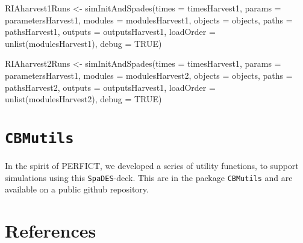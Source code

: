 \documentclass[
]{article}
\newenvironment{Shaded}{\begin{snugshade}}{\end{snugshade}}
\newcommand{\AttributeTok}[1]{\textcolor[rgb]{0.77,0.63,0.00}{#1}}
\newcommand{\ConstantTok}[1]{\textcolor[rgb]{0.00,0.00,0.00}{#1}}
\newcommand{\FunctionTok}[1]{\textcolor[rgb]{0.00,0.00,0.00}{#1}}
\newcommand{\NormalTok}[1]{#1}
\newcommand{\OtherTok}[1]{\textcolor[rgb]{0.56,0.35,0.01}{#1}}
\begin{document}
\begin{Shaded}
\begin{Highlighting}[]
\NormalTok{RIAharvest1Runs }\OtherTok{\textless{}{-}} \FunctionTok{simInitAndSpades}\NormalTok{(}\AttributeTok{times =}\NormalTok{ timesHarvest1,}
                               \AttributeTok{params =}\NormalTok{ parametersHarvest1,}
                               \AttributeTok{modules =}\NormalTok{ modulesHarvest1,}
                               \AttributeTok{objects =}\NormalTok{ objects,}
                               \AttributeTok{paths =}\NormalTok{ pathsHarvest1,}
                               \AttributeTok{outputs =}\NormalTok{ outputsHarvest1,}
                               \AttributeTok{loadOrder =} \FunctionTok{unlist}\NormalTok{(modulesHarvest1),}
                               \AttributeTok{debug =} \ConstantTok{TRUE}\NormalTok{)}

\NormalTok{RIAharvest2Runs }\OtherTok{\textless{}{-}} \FunctionTok{simInitAndSpades}\NormalTok{(}\AttributeTok{times =}\NormalTok{ timesHarvest1,}
                               \AttributeTok{params =}\NormalTok{ parametersHarvest1,}
                               \AttributeTok{modules =}\NormalTok{ modulesHarvest2,}
                               \AttributeTok{objects =}\NormalTok{ objects,}
                               \AttributeTok{paths =}\NormalTok{ pathsHarvest2,}
                               \AttributeTok{outputs =}\NormalTok{ outputsHarvest1,}
                               \AttributeTok{loadOrder =} \FunctionTok{unlist}\NormalTok{(modulesHarvest2),}
                               \AttributeTok{debug =} \ConstantTok{TRUE}\NormalTok{)}
\end{Highlighting}
\end{Shaded}

\hypertarget{cbmutils}{%
\section{\texorpdfstring{\texttt{CBMutils}}{CBMutils}}\label{cbmutils}}

In the spirit of PERFICT, we developed a series of utility functions, to
support simulations using this \texttt{SpaDES}-deck. This are in the
package \texttt{CBMutils} and are available on a public github
repository.

\hypertarget{references}{%
\section{References}\label{references}}
\end{document}
